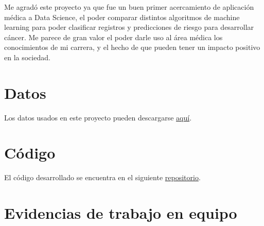 \documentclass[journal]{IEEEtran}                                                          %
\begin{document}
            Me agradó este proyecto ya que fue un buen primer acercamiento de aplicación médica a Data Science, el poder comparar distintos algoritmos de machine learning para poder clasificar registros y predicciones de riesgo para desarrollar cáncer. Me parece de gran valor el poder darle uso al área médica los conocimientos de mi carrera, y el hecho de que pueden tener un impacto positivo en la sociedad.
        
    \appendices
    
    \section{Datos} \label{data}

        Los datos usados en este proyecto pueden descargarse \href{https://www.kaggle.com/code/ravaliraj/risk-classification-of-cervical-cancer}{aquí}.

    \section{Código}

        El código desarrollado se encuentra en el siguiente \href{https://github.com/JuanEcheagaray75/cancer-clf}{repositorio}.
    \section{Evidencias de trabajo en equipo}

    
    
\end{document}

